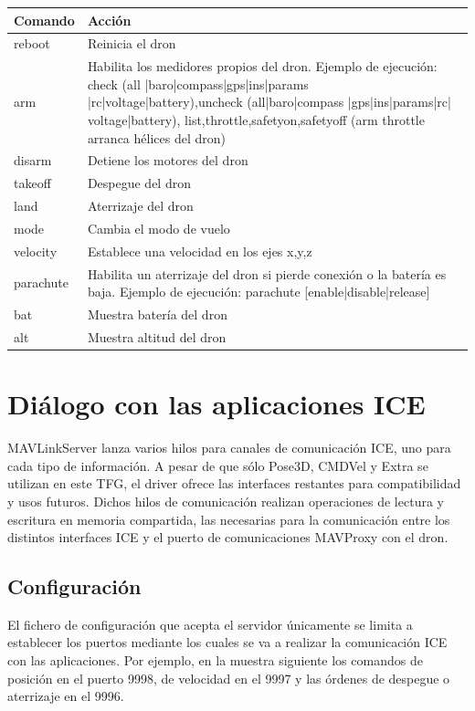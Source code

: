 \begin{center}
  \label{comandos}
  \begin{tabular}{ | l | p{11cm} |}
  \hline
  \textbf{Comando} & \textbf{Acción} \\ \hline
  reboot& Reinicia el dron\\ \hline
  arm & Habilita los medidores propios del dron. Ejemplo de ejecución: check (all |baro|compass|gps|ins|params |rc|voltage|battery),uncheck (all|baro|compass |gps|ins|params|rc| voltage|battery), list,throttle,safetyon,safetyoff (arm throttle arranca hélices del dron)\\ \hline
  disarm& Detiene los motores del dron \\ \hline
  takeoff& Despegue del dron\\ \hline
  land&Aterrizaje del dron \\ \hline
  mode& Cambia el modo de vuelo\\ \hline
  velocity& Establece una velocidad en los ejes x,y,z\\ \hline
  parachute& Habilita un aterrizaje del dron si pierde conexión o la batería es baja. Ejemplo de ejecución: parachute [enable|disable|release]\\ \hline
  bat& Muestra batería del dron\\ \hline
  alt& Muestra altitud del dron\\ \hline
  \end{tabular}
\end{center}

\section{Diálogo con las aplicaciones ICE}

MAVLinkServer lanza varios hilos para canales de comunicación ICE, uno para cada tipo de información. A pesar de que sólo Pose3D, CMDVel y Extra se utilizan en este TFG, el driver ofrece las interfaces restantes para compatibilidad y usos futuros. Dichos hilos de comunicación realizan operaciones de lectura y escritura en memoria compartida, las necesarias para la comunicación entre los distintos interfaces ICE y el puerto de comunicaciones MAVProxy con el dron.

\subsection{Configuración}
El fichero de configuración que acepta el servidor únicamente se limita a establecer los puertos mediante los cuales se va a realizar la comunicación ICE con las aplicaciones. Por ejemplo, en la muestra siguiente los comandos de posición en el puerto 9998, de velocidad en el 9997 y las órdenes de despegue o aterrizaje en el 9996.

